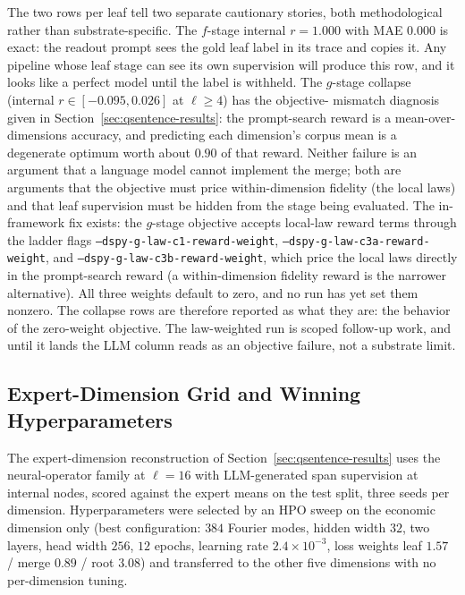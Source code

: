 The two rows per leaf tell two separate cautionary stories, both
methodological rather than substrate-specific. The $f$-stage internal
$r = 1.000$ with MAE $0.000$ is exact: the readout prompt sees the gold
leaf label in its trace and copies it. Any pipeline whose leaf stage
can see its own supervision will produce this row, and it looks like a
perfect model until the label is withheld. The $g$-stage collapse
(internal $r \in [-0.095, 0.026]$ at $\ell \geq 4$) has the objective-
mismatch diagnosis given in Section~\ref{sec:qsentence-results}: the
prompt-search reward is a mean-over-dimensions accuracy, and
predicting each dimension's corpus mean is a degenerate optimum worth
about $0.90$ of that reward. Neither failure is an argument that a
language model cannot implement the merge; both are arguments that the
objective must price within-dimension fidelity (the local laws) and
that leaf supervision must be hidden from the stage being evaluated.
The in-framework fix exists: the $g$-stage objective accepts local-law
reward terms through the ladder flags
\texttt{--dspy-g-law-c1-reward-weight},
\texttt{--dspy-g-law-c3a-reward-weight}, and
\texttt{--dspy-g-law-c3b-reward-weight}, which price the local laws
directly in the prompt-search reward (a within-dimension fidelity
reward is the narrower alternative). All three weights default to
zero, and no run has yet set them nonzero. The collapse rows are
therefore reported as what they are: the behavior of the zero-weight
objective. The law-weighted run is scoped follow-up work, and until it
lands the LLM column reads as an objective failure, not a substrate
limit.

\subsection{Expert-Dimension Grid and Winning Hyperparameters}

The expert-dimension reconstruction of
Section~\ref{sec:qsentence-results} uses the neural-operator family at
$\ell = 16$ with LLM-generated span supervision at internal nodes,
scored against the \citet{BenoitEtAl2025} expert means on the test
split, three seeds per dimension. Hyperparameters were selected by an
HPO sweep on the economic dimension only
(best configuration: $384$ Fourier modes, hidden width $32$, two
layers, head width $256$, $12$ epochs, learning rate
$2.4\times10^{-3}$, loss weights leaf $1.57$ / merge $0.89$ / root
$3.08$) and transferred to the other five dimensions with no
per-dimension tuning.


